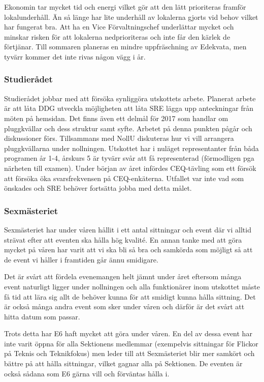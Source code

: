 \documentclass[../_main/handlingar.tex]{subfiles}
\begin{document}
Ekonomin tar mycket tid och energi vilket gör att den lätt prioriteras framför lokalunderhåll. Än så länge har lite underhåll av lokalerna gjorts vid behov vilket har fungerat bra. Att ha en Vice Förvaltningschef underlättar mycket och minskar risken för att lokalerna nedprioriteras och inte får den kärlek de förtjänar. Till sommaren planeras en mindre uppfräschning av Edekvata, men tyvärr kommer det inte rivas någon vägg i år.

\subsubsection*{Studierådet}
Studierådet jobbar med att försöka synliggöra utskottets arbete. Planerat arbete är att låta DDG utveckla möjligheten att låta SRE lägga upp anteckningar från möten på hemsidan. Det finns även ett delmål för 2017 som handlar om pluggkvällar och dess struktur samt syfte. Arbetet på denna punkten pågår och diskussioner förs. Tillsammans med NollU diskuteras hur vi vill arrangera pluggkvällarna under nollningen. Utskottet har i nuläget representanter från båda programen år 1-4, årskurs 5 är tyvärr svår att få representerad (förmodligen pga närheten till examen). Under början av året infördes CEQ-tävling som ett försök att försöka öka svarsfrekvensen på CEQ-enkäterna. Utfallet var inte vad som önskades och SRE behöver fortsätta jobba med detta målet.

\subsubsection*{Sexmästeriet}
Sexmästeriet har under våren hållit i ett antal sittningar och event där vi alltid strävat efter att eventen ska hålla hög kvalité. En annan tanke med att göra mycket på våren har varit att vi ska bli så bra och samkörda som möjligt så att de event vi håller i framtiden går ännu smidigare.

Det är svårt att fördela evenemangen helt jämnt under året eftersom många event naturligt ligger under nollningen och alla funktionärer inom utskottet måste få tid att lära sig allt de behöver kunna för att smidigt kunna hålla sittning. Det är också många andra event som sker under våren och därför är det svårt att hitta datum som passar.

Trots detta har E6 haft mycket att göra under våren. En del av dessa event har inte varit öppna för alla Sektionens medlemmar (exempelvis sittningar för Flickor på Teknis och Teknikfokus) men leder till att Sexmästeriet blir mer samkört och bättre på att hålla sittningar, vilket gagnar alla på Sektionen. De eventen är också sådana som E6 gärna vill och förväntas hålla i.
\end{document}

